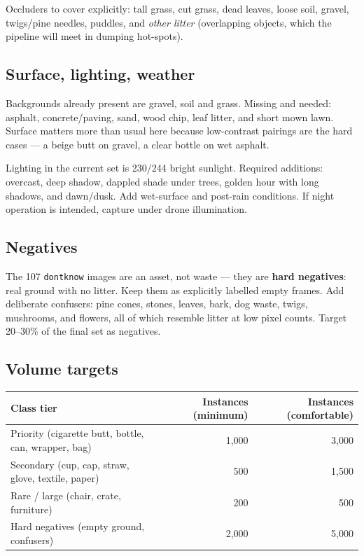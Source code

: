 \documentclass[11pt,a4paper]{article}
\begin{document}
Occluders to cover explicitly: tall grass, cut grass, dead leaves, loose soil,
gravel, twigs/pine needles, puddles, and \emph{other litter} (overlapping
objects, which the pipeline will meet in dumping hot-spots).

\subsection{Surface, lighting, weather}

Backgrounds already present are gravel, soil and grass. Missing and needed:
asphalt, concrete/paving, sand, wood chip, leaf litter, and short mown lawn.
Surface matters more than usual here because low-contrast pairings are the hard
cases --- a beige butt on gravel, a clear bottle on wet asphalt.

Lighting in the current set is 230/244 bright sunlight. Required additions:
overcast, deep shadow, dappled shade under trees, golden hour with long shadows,
and dawn/dusk. Add wet-surface and post-rain conditions. If night operation is
intended, capture under drone illumination.

\subsection{Negatives}

The 107 \texttt{dontknow} images are an asset, not waste --- they are
\textbf{hard negatives}: real ground with no litter. Keep them as explicitly
labelled empty frames. Add deliberate confusers: pine cones, stones, leaves,
bark, dog waste, twigs, mushrooms, and flowers, all of which resemble litter at
low pixel counts. Target 20--30\% of the final set as negatives.

\subsection{Volume targets}

\begin{center}
\begin{tabular}{lrr}
\toprule
\textbf{Class tier} & \textbf{Instances (minimum)} & \textbf{Instances (comfortable)} \\
\midrule
Priority (cigarette butt, bottle, can, wrapper, bag) & 1{,}000 & 3{,}000 \\
Secondary (cup, cap, straw, glove, textile, paper)   & 500     & 1{,}500 \\
Rare / large (chair, crate, furniture)               & 200     & 500 \\
Hard negatives (empty ground, confusers)             & 2{,}000 & 5{,}000 \\
\bottomrule
\end{tabular}
\end{center}
\end{document}
